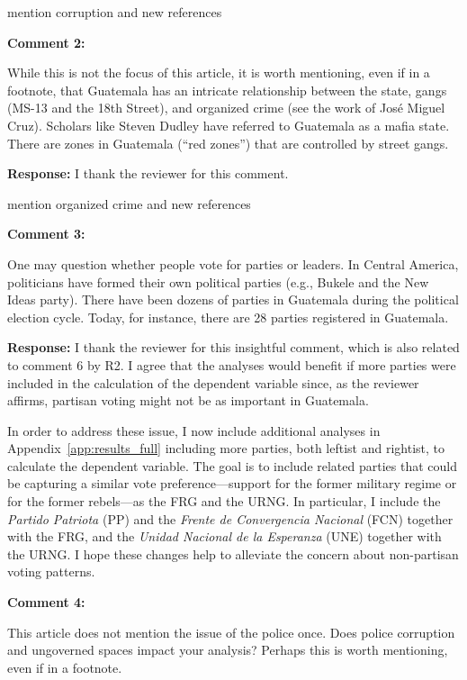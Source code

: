 \documentclass[12pt, a4paper, notitlepage]{article}
\begin{document}
mention corruption and new references

\vspace{15pt}
\noindent\textbf{Comment 2:}
\begin{displayquote}
While this is not the focus of this article, it is worth mentioning, even if in a footnote, that Guatemala has an intricate relationship between the state, gangs (MS-13 and the 18th Street), and organized crime (see the work of José Miguel Cruz). Scholars like Steven Dudley have referred to Guatemala as a mafia state. There are zones in Guatemala (“red zones”) that are controlled by street gangs.
\end{displayquote}

\noindent\textbf{Response:} I thank the reviewer for this comment. {}

mention organized crime and new references

\vspace{15pt}
\noindent\textbf{Comment 3:}
\begin{displayquote}
One may question whether people vote for parties or leaders. In Central America, politicians have formed their own political parties (e.g., Bukele and the New Ideas party). There have been dozens of parties in Guatemala during the political election cycle. Today, for instance, there are 28 parties registered in Guatemala.
\end{displayquote}

\noindent\textbf{Response:} I thank the reviewer for this insightful comment, which is also related to comment 6 by R2. I agree that the analyses would benefit if more parties were included in the calculation of the dependent variable since, as the reviewer affirms, partisan voting might not be as important in Guatemala.

In order to address these issue, I now include additional analyses in Appendix~\ref{app:results_full} including more parties, both leftist and rightist, to calculate the dependent variable.
The goal is to include related parties that could be capturing a similar vote preference---support for the former military regime or for the former rebels---as the FRG and the URNG.
In particular, I include the \textit{Partido Patriota} (PP) and the \textit{Frente de Convergencia Nacional} (FCN) together with the FRG, and the \textit{Unidad Nacional de la Esperanza} (UNE) together with the URNG.
I hope these changes help to alleviate the concern about non-partisan voting patterns.

\vspace{15pt}
\noindent\textbf{Comment 4:}
\begin{displayquote}
This article does not mention the issue of the police once. Does police corruption and ungoverned spaces impact your analysis? Perhaps this is worth mentioning, even if in a footnote.
\end{displayquote}
\end{document}
